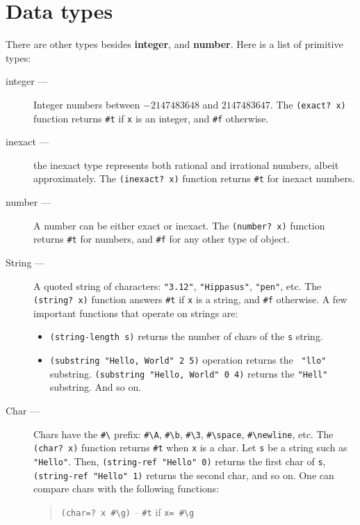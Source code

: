 \documentclass[a4paper,12pt]{book}
\begin{document}
\section{Data types}
There are other types
besides {\bf integer}, and {\bf number}. 
Here is a  list of primitive types:
\begin{description}
	\item[integer ---] Integer numbers between $-2147483648$ and $2147483647$. 
		The \verb|(exact? x)| function returns \verb|#t| if \verb|x|
		is an integer, and \verb|#f| otherwise.
	\item[inexact ---] the inexact type represents both
		rational and irrational numbers, albeit approximately.
		The \verb|(inexact? x)| function returns \verb|#t| for
		inexact numbers.
	\item[number ---] A number can be either exact or inexact.
		The \verb|(number? x)| function returns \verb|#t| for numbers,
		and \verb|#f| for any other type of object.
	\item[String ---] A quoted string 
		of characters: \verb|"3.12"|, \verb|"Hippasus"|, \verb|"pen"|, etc.
		The \verb|(string? x)| function answers \verb|#t| 
		if \verb|x| is a string, 
		and \verb|#f| otherwise.
		A few important functions that operate on strings are:
		\begin{itemize}
			\item \verb|(string-length s)| returns the number
				of chars of the \verb|s| string.
			\item\verb|(substring "Hello, World" 2 5)| operation
				returns the \verb| "llo"| substring.
				\verb|(substring "Hello, World" 0 4)| returns the
				\verb|"Hell"| substring. And so on.
		\end{itemize}
	\item[Char ---] Chars have the \verb|#\|
		prefix: 
		\verb|#\A|,
		\verb|#\b|, \verb|#\3|, \verb|#\space|,
		\verb|#\newline|, etc.
		The \verb|(char? x)| function returns \verb|#t|
		when \verb|x| is a char.
		Let \verb|s| be
		a string such as \verb|"Hello"|. Then,
		\verb|(string-ref "Hello" 0)|
		returns the first char of \verb|s|,
		\verb|(string-ref "Hello" 1)| returns
		the second char, and so on. One can compare
		chars with the following functions:
		\begin{quote}
			\verb|(char=? x #\g)| -- \verb|#t| if \verb|x= #\g|\\

\end{quote}
\end{description}
\end{document}
